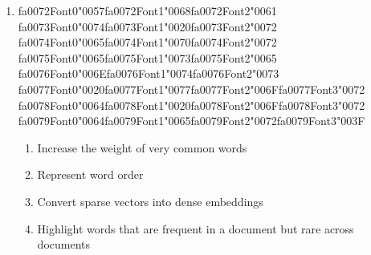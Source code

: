 \documentclass[12pt]{article}
\begin{document}
\begin{enumerate}[label=Q\arabic*.]
\item {\csname fa0072Font0\endcsname\char"0057}{\csname fa0072Font1\endcsname\char"0068}{\csname fa0072Font2\endcsname\char"0061} {\csname fa0073Font0\endcsname\char"0074}{\csname fa0073Font1\endcsname\char"0020}{\csname fa0073Font2\endcsname\char"0072} {\csname fa0074Font0\endcsname\char"0065}{\csname fa0074Font1\endcsname\char"0070}{\csname fa0074Font2\endcsname\char"0072} {\csname fa0075Font0\endcsname\char"0065}{\csname fa0075Font1\endcsname\char"0073}{\csname fa0075Font2\endcsname\char"0065} {\csname fa0076Font0\endcsname\char"006E}{\csname fa0076Font1\endcsname\char"0074}{\csname fa0076Font2\endcsname\char"0073} {\csname fa0077Font0\endcsname\char"0020}{\csname fa0077Font1\endcsname\char"0077}{\csname fa0077Font2\endcsname\char"006F}{\csname fa0077Font3\endcsname\char"0072} {\csname fa0078Font0\endcsname\char"0064}{\csname fa0078Font1\endcsname\char"0020}{\csname fa0078Font2\endcsname\char"006F}{\csname fa0078Font3\endcsname\char"0072} {\csname fa0079Font0\endcsname\char"0064}{\csname fa0079Font1\endcsname\char"0065}{\csname fa0079Font2\endcsname\char"0072}{\csname fa0079Font3\endcsname\char"003F}
\begin{enumerate}[label=(\Alph*)]
    \item Increase the weight of very common words
    \item Represent word order
    \item Convert sparse vectors into dense embeddings
    \item Highlight words that are frequent in a document but rare across documents
\end{enumerate}

\end{enumerate}
\end{document}
